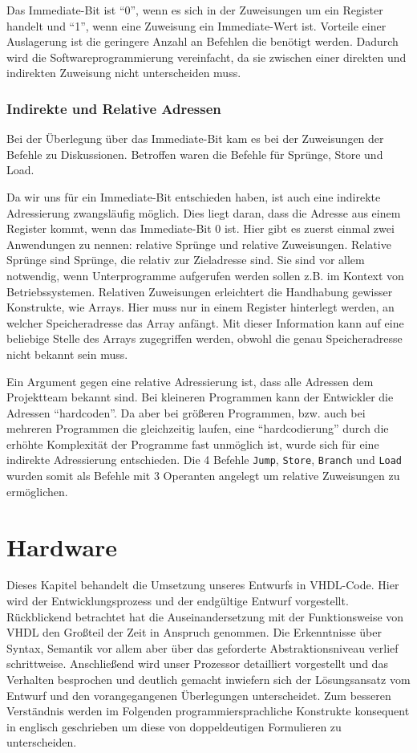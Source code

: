 \documentclass[paper=a4,fontsize=11pt,twocolumn]{scrreprt}
\begin{document}
Das Immediate-Bit ist \enquote{0}, wenn es sich in der Zuweisungen um ein Register handelt und \enquote{1}, wenn eine Zuweisung ein Immediate-Wert ist.
Vorteile einer Auslagerung ist die geringere Anzahl an Befehlen die benötigt werden.
Dadurch wird die Softwareprogrammierung vereinfacht, da sie zwischen einer direkten und indirekten Zuweisung nicht unterscheiden muss.

\subsection{Indirekte und Relative Adressen}
\label{subsec:indirekte_und_relative_adressen}
Bei der Überlegung über das Immediate-Bit kam es bei der Zuweisungen der Befehle zu Diskussionen.
Betroffen waren die Befehle für Sprünge, Store und Load.

Da wir uns für ein Immediate-Bit entschieden haben, ist auch eine indirekte Adressierung zwangsläufig möglich.
Dies liegt daran, dass die Adresse aus einem Register kommt, wenn das Immediate-Bit 0 ist.
Hier gibt es zuerst einmal zwei Anwendungen zu nennen: relative Sprünge und relative Zuweisungen.
Relative Sprünge sind Sprünge, die relativ zur Zieladresse sind.
Sie sind vor allem notwendig, wenn Unterprogramme aufgerufen werden sollen z.B. im Kontext von Betriebssystemen.
Relativen Zuweisungen erleichtert die Handhabung gewisser Konstrukte, wie Arrays.
Hier muss nur in einem Register hinterlegt werden, an welcher Speicheradresse das Array anfängt.
Mit dieser Information kann auf eine beliebige Stelle des Arrays zugegriffen werden, obwohl die genau Speicheradresse nicht bekannt sein muss.

Ein Argument gegen eine relative Adressierung ist, dass alle Adressen dem Projektteam bekannt sind.
Bei kleineren Programmen kann der Entwickler die Adressen \enquote{hardcoden}.
Da aber bei größeren Programmen, bzw. auch bei mehreren Programmen die gleichzeitig laufen, eine  \enquote{hardcodierung} durch die erhöhte Komplexität der Programme fast unmöglich ist, wurde sich für eine indirekte Adressierung entschieden.
Die 4 Befehle \texttt{Jump}, \texttt{Store}, \texttt{Branch} und \texttt{Load} wurden somit als Befehle mit 3 Operanten angelegt um relative Zuweisungen zu ermöglichen.

\chapter{Hardware}
\label{ch:hardware}

Dieses Kapitel behandelt die Umsetzung unseres Entwurfs in VHDL-Code.
Hier wird der Entwicklungsprozess und der endgültige Entwurf vorgestellt. Rückblickend betrachtet hat die Auseinandersetzung mit der Funktionsweise von VHDL den Großteil der Zeit in Anspruch genommen.
Die Erkenntnisse über Syntax, Semantik vor allem aber über das geforderte Abstraktionsniveau verlief schrittweise.
Anschließend wird unser Prozessor detailliert vorgestellt und das Verhalten besprochen und deutlich gemacht inwiefern sich der Lösungsansatz vom Entwurf und den vorangegangenen Überlegungen unterscheidet.
Zum besseren Verständnis werden im Folgenden programmiersprachliche Konstrukte konsequent in englisch geschrieben um diese von doppeldeutigen Formulieren zu unterscheiden.
\end{document}
